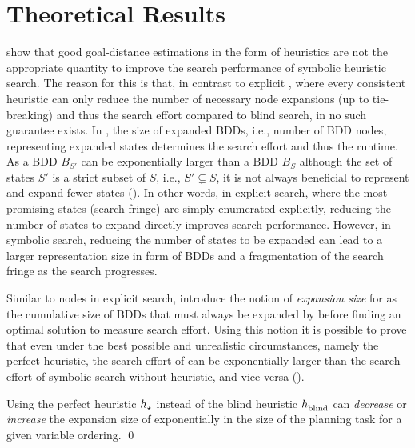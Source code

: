 \section{Theoretical Results}

\textcite{speck-et-al-icaps2020} show that good goal-distance estimations in the form of heuristics are not the appropriate quantity to improve the search performance of symbolic heuristic search.
The reason for this is that, in contrast to explicit \astar{}, where every
consistent heuristic can only reduce the number of necessary node expansions (up to tie-breaking) and thus the search effort compared to blind search, in \bddastar{} no such guarantee exists.
In \bddastar{}, the size of expanded BDDs, i.e., number of BDD nodes, representing expanded states determines the search effort and thus the runtime.
As a BDD $B_{S'}$ can be exponentially larger than a BDD $B_{S}$ although the set of states $S'$ is a strict subset of $S$, i.e., $S' \subsetneq S$, it is not always beneficial to represent and expand fewer states ().
In other words, in explicit search, where the most promising states (search fringe) are simply enumerated explicitly, reducing the number of states to expand directly improves search performance.
However, in symbolic search, reducing the number of states to be expanded can lead to a larger representation size in form of BDDs and a fragmentation of the search fringe as the search progresses.

Similar to  nodes in explicit search, \textcite{speck-et-al-icaps2020} introduce the notion of \emph{expansion size} for \bddastar{} as the cumulative size of BDDs that must always be expanded by \bddastar{} before finding an optimal solution to measure search effort.
Using this notion it is possible to prove that even under the best possible and unrealistic circumstances, namely the perfect heuristic, the search effort of \bddastar{} can be exponentially larger than the search effort of symbolic
search without heuristic, and vice versa ().

\begin{theorem}\label{thm:bddastar}
    Using the perfect heuristic $h_\text{\scriptsize{\ensuremath{\star}}}^\text{\scriptsize{}}$ instead of the blind heuristic $h_\text{\scriptsize{blind}}^\text{\scriptsize{}}$ can \emph{decrease} or \emph{increase} the expansion size of \bddastar{} exponentially in the size of the planning task for a given variable ordering. \qed
\end{theorem}

